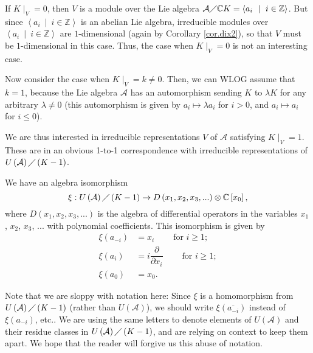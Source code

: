 \documentclass[etingof-lie.tex]{subfiles}
\begin{document}
If $K\mid_{V}=0$, then $V$ is a module over the Lie algebra $\mathcal{A}%
\diagup\mathbb{C}K=\left\langle a_{i}\ \mid\ i\in\mathbb{Z}\right\rangle $.
But since $\left\langle a_{i}\ \mid\ i\in\mathbb{Z}\right\rangle $ is an
abelian Lie algebra, irreducible modules over $\left\langle a_{i}\ \mid
\ i\in\mathbb{Z}\right\rangle $ are $1$-dimensional (again by Corollary
\ref{cor.dix2}), so that $V$ must be $1$-dimensional in this case. Thus, the
case when $K\mid_{V}=0$ is not an interesting case.

Now consider the case when $K\mid_{V}=k\neq0$. Then, we can WLOG assume that
$k=1$, because the Lie algebra $\mathcal{A}$ has an automorphism sending $K$
to $\lambda K$ for any arbitrary $\lambda\neq0$ (this automorphism is given by
$a_{i}\mapsto\lambda a_{i}$ for $i>0$, and $a_{i}\mapsto a_{i}$ for $i\leq0$).

We are thus interested in irreducible representations $V$ of $\mathcal{A}$
satisfying $K\mid_{V}=1$. These are in an obvious 1-to-1 correspondence with
irreducible representations of $U\left(  \mathcal{A}\right)  \diagup\left(
K-1\right)  $.

\begin{proposition}
\label{prop.K-1}We have an algebra isomorphism%
\[
\xi:U\left(  \mathcal{A}\right)  \diagup\left(  K-1\right)  \rightarrow
D\left(  x_{1},x_{2},x_{3},...\right)  \otimes\mathbb{C}\left[  x_{0}\right]
,
\]
where $D\left(  x_{1},x_{2},x_{3},...\right)  $ is the algebra of differential
operators in the variables $x_{1}$, $x_{2}$, $x_{3}$, $...$ with polynomial
coefficients. This isomorphism is given by%
\begin{align*}
\xi\left(  a_{-i}\right)   &  =x_{i}\ \ \ \ \ \ \ \ \ \ \text{for }i\geq1;\\
\xi\left(  a_{i}\right)   &  =i\dfrac{\partial}{\partial x_{i}}%
\ \ \ \ \ \ \ \ \ \ \text{for }i\geq1;\\
\xi\left(  a_{0}\right)   &  =x_{0}.
\end{align*}

\end{proposition}

Note that we are sloppy with notation here: Since $\xi$ is a homomorphism from
$U\left(  \mathcal{A}\right)  \diagup\left(  K-1\right)  $ (rather than
$U\left(  \mathcal{A}\right)  $), we should write $\xi\left(  \overline
{a_{-i}}\right)  $ instead of $\xi\left(  a_{-i}\right)  $, etc.. We are using
the same letters to denote elements of $U\left(  \mathcal{A}\right)  $ and
their residue classes in $U\left(  \mathcal{A}\right)  \diagup\left(
K-1\right)  $, and are relying on context to keep them apart. We hope that the
reader will forgive us this abuse of notation.
\end{document}
